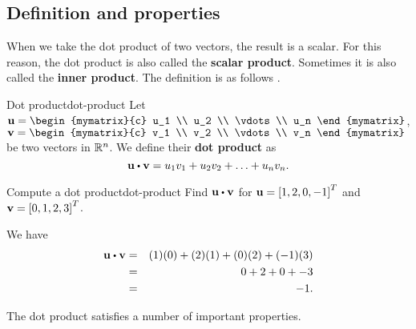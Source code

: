 \subsection{Definition and properties}

When we take the dot product of two vectors, the result is a
scalar. For this reason, the dot product is also called the
\textbf{scalar product}. Sometimes it is also called the \textbf{inner
  product}. The definition is as follows%
%
%
.

\begin{definition}{Dot product}{dot-product}
  Let $\vect{u}=\begin{mymatrix}{c}
    u_1 \\
    u_2 \\
    \vdots \\
    u_n
  \end{mymatrix}$, $\vect{v}= \begin{mymatrix}{c}
    v_1 \\
    v_2 \\
    \vdots \\
    v_n
  \end{mymatrix}$ be two vectors in $\mathbb{R}^n$. We
  define their \textbf{dot product} as
  \begin{equation*}
    \vect{u}\dotprod \vect{v} = u_1v_1+u_2v_2+\ldots+u_nv_n.
  \end{equation*}
\end{definition}

\begin{example}{Compute a dot product}{dot-product}
  Find $\vect{u} \dotprod \vect{v}$ for $\vect{u}=\mat{1,2,0,-1}^T$
  and $\vect{v}=\mat{0,1,2,3}^T$.
\end{example}

\begin{solution}
  We have
  \begin{eqnarray*}
    \vect{u} \dotprod \vect{v}
    &=&
        (1)(0) + (2)(1) + (0)(2) + (-1)(3) \\
    &=&
        0 + 2 + 0 + -3 \\
    &=&
        -1.
  \end{eqnarray*}
\end{solution}

The dot product satisfies a number of important properties.


